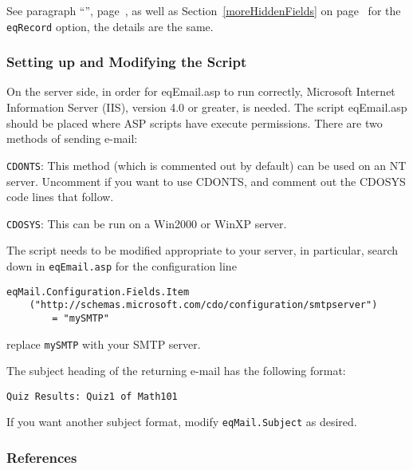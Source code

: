 \documentclass{article}
\begin{document}
\medskip See paragraph ``'', page~\pageref{hierarchalfields}, as well as
Section~\ref{moreHiddenFields} on page~\pageref{moreHiddenFields} for
the \texttt{eqRecord} option, the details are the same.

\subsubsection{Setting up and Modifying the Script}

On the server side, in order for \textsf{eqEmail.asp} to run
correctly, Microsoft Internet Information Server (IIS), version
4.0 or greater, is needed. The script \textsf{eqEmail.asp} should
be placed where ASP scripts have execute permissions. There are
two methods of sending e-mail:
\begin{questions}
    \item \texttt{CDONTS}: This method (which is commented out by default) can be used on
        an NT server. Uncomment if you want to use CDONTS, and comment out the CDOSYS code lines
        that follow.
    \item \texttt{CDOSYS}: This can be run on a Win2000 or WinXP server.
\end{questions}

The script needs to be modified appropriate to your server, in particular, search down
in \texttt{eqEmail.asp} for the configuration line
\begin{Verbatim}[xleftmargin=\leftmargini,fontsize=\small]
eqMail.Configuration.Fields.Item
    ("http://schemas.microsoft.com/cdo/configuration/smtpserver")
        = "mySMTP"
\end{Verbatim}
\noindent replace \texttt{mySMTP} with your SMTP server.

The subject heading of the returning e-mail has the following format:
\begin{Verbatim}[xleftmargin=\leftmargini,fontsize=\small]
Quiz Results: Quiz1 of Math101
\end{Verbatim}
If you want another subject format, modify \texttt{eqMail.Subject} as
desired.

\subsubsection{References}
\end{document}
